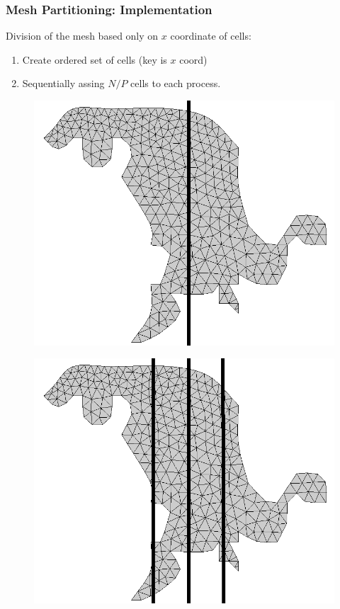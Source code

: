 \documentclass{beamer}
\begin{document}
\begin{frame}
	\frametitle{Mesh Partitioning: Implementation}

	Division of the mesh based only on $x$ coordinate of cells:
	\begin{enumerate}
		\item Create ordered set of cells (key is $x$ coord)
		\item Sequentially assing $N/P$ cells to each process.
	\end{enumerate}

	\begin{multicols}{2}
		\begin{figure}
			\begin{center}
				\includegraphics[width=0.955\columnwidth]{report.may/images/foz_p2_msh}
			\end{center}
		\end{figure}
		\begin{figure}
			\begin{center}
				\includegraphics[width=0.955\columnwidth]{report.may/images/foz_p4_msh}
			\end{center}
		\end{figure}
	\end{multicols}
\end{frame}
\end{document}
